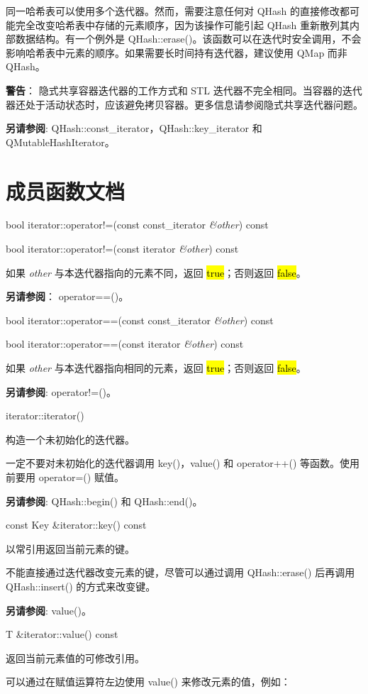 同一哈希表可以使用多个迭代器。然而，需要注意任何对 QHash 的直接修改都可能完全改变哈希表中存储的元素顺序，因为该操作可能引起 QHash 重新散列其内部数据结构。有一个例外是 QHash::erase()。该函数可以在迭代时安全调用，不会影响哈希表中元素的顺序。如果需要长时间持有迭代器，建议使用 QMap 而非 QHash。

\textbf{警告}： 隐式共享容器迭代器的工作方式和 STL 迭代器不完全相同。当容器的迭代器还处于活动状态时，应该避免拷贝容器。更多信息请参阅隐式共享迭代器问题。

\textbf{另请参阅}: QHash::const\_iterator，QHash::key\_iterator 和
QMutableHashIterator。

\section{成员函数文档}

bool iterator::operator!=(const const\_iterator \emph{\&other}) const

bool iterator::operator!=(const iterator \emph{\&other}) const

如果 \emph{other} 与本迭代器指向的元素不同，返回 \hl{true}；否则返回 \hl{false}。

\textbf{另请参阅}： operator==()。

bool iterator::operator==(const const\_iterator \emph{\&other}) const

bool iterator::operator==(const iterator \emph{\&other}) const

如果 \emph{other} 与本迭代器指向相同的元素，返回 \hl{true}；否则返回 \hl{false}。

\textbf{另请参阅}:  operator!=()。

iterator::iterator()

构造一个未初始化的迭代器。

一定不要对未初始化的迭代器调用 key()，value() 和 operator++() 等函数。使用前要用 operator=() 赋值。

\textbf{另请参阅}: QHash::begin() 和 QHash::end()。

const Key \&iterator::key() const

以常引用返回当前元素的键。

不能直接通过迭代器改变元素的键，尽管可以通过调用 QHash::erase() 后再调用 QHash::insert() 的方式来改变键。

\textbf{另请参阅}: value()。

T \&iterator::value() const

返回当前元素值的可修改引用。

可以通过在赋值运算符左边使用 value() 来修改元素的值，例如：

